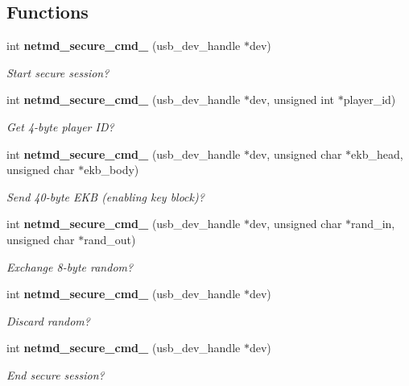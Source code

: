 \subsection*{Functions}
\begin{DoxyCompactItemize}
\item 
int {\bf netmd\_\-secure\_\-cmd\_} (usb\_\-dev\_\-handle $\ast$dev)
\begin{DoxyCompactList}\small\item\em Start secure session? \item\end{DoxyCompactList}\item 
int {\bf netmd\_\-secure\_\-cmd\_} (usb\_\-dev\_\-handle $\ast$dev, unsigned int $\ast$player\_\-id)
\begin{DoxyCompactList}\small\item\em Get 4-\/byte player ID? \item\end{DoxyCompactList}\item 
int {\bf netmd\_\-secure\_\-cmd\_} (usb\_\-dev\_\-handle $\ast$dev, unsigned char $\ast$ekb\_\-head, unsigned char $\ast$ekb\_\-body)
\begin{DoxyCompactList}\small\item\em Send 40-\/byte EKB (enabling key block)? \item\end{DoxyCompactList}\item 
int {\bf netmd\_\-secure\_\-cmd\_} (usb\_\-dev\_\-handle $\ast$dev, unsigned char $\ast$rand\_\-in, unsigned char $\ast$rand\_\-out)
\begin{DoxyCompactList}\small\item\em Exchange 8-\/byte random? \item\end{DoxyCompactList}\item 
int {\bf netmd\_\-secure\_\-cmd\_} (usb\_\-dev\_\-handle $\ast$dev)
\begin{DoxyCompactList}\small\item\em Discard random? \item\end{DoxyCompactList}\item 
int {\bf netmd\_\-secure\_\-cmd\_} (usb\_\-dev\_\-handle $\ast$dev)
\begin{DoxyCompactList}\small\item\em End secure session? \item\end{DoxyCompactList}\item 

\end{DoxyCompactItemize}
